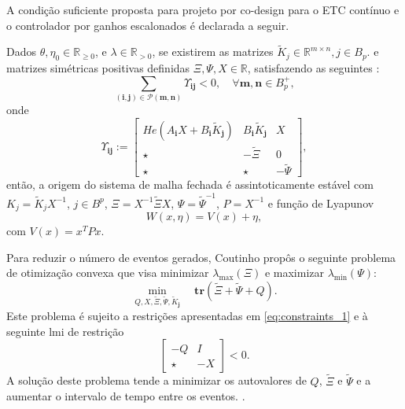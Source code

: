 A condição suficiente proposta para projeto por co-design para o ETC contínuo  e o controlador por ganhos escalonados é declarada a seguir.
\begin{theorem}
  \label{theorem:constraints-2}
  Dados $\theta, \eta_0 \in \mathbb{R}_{\geq 0}$, e $\lambda \in \mathbb{R}_{> 0}$, se existirem as matrizes $\tilde{K}_j \in \mathbb{R}^{m \times n}, j \in B_p$. e matrizes simétricas positivas definidas $\Xi, \Psi, X \in \mathbb{R}$, satisfazendo as seguintes :
  \begin{equation}
    \sum_{(\mathbf{i}, \mathbf{j}) \in \mathscr{P} (\mathbf{m},\mathbf{n})} \Upsilon_{\mathbf{ij}} < 0, \quad \forall \mathbf{m}, \mathbf{n} \in B_p^+,
    \label{eq:constraints_1}
  \end{equation}
  onde
  \begin{equation}
    \Upsilon_{\mathbf{ij}} :=
    \begin{bmatrix}
      He(A_\mathbf{i}X +B_\mathbf{i}\tilde{K}_\mathbf{j}) & B_\mathbf{i}\tilde{K}_{\mathbf{j}} & X             \\
      \star                                               & -\tilde{\Xi}                       & 0             \\
      \star                                               & \star                              & -\tilde{\Psi}
    \end{bmatrix},
  \end{equation}
  então, a origem do sistema de malha fechada é assintoticamente estável com $K_j = \tilde{K}_jX^{-1}$, $j \in B^p$, $\Xi= X^{-1}\tilde{\Xi}X$, $\Psi = \tilde{\Psi}^{-1}$, $P = X^{-1}$ e função de Lyapunov
  \begin{equation}
    W(x, \eta) = V(x) + \eta,
  \end{equation}
  com $V(x)=x^TPx$.
\end{theorem}

Para reduzir o número de eventos gerados, Coutinho propôs o seguinte problema de otimização convexa que visa minimizar $\lambda_{\max} (\Xi)$ e maximizar $\lambda_{\min}(\Psi)$: \begin{equation}\underset{Q, X, \tilde{\Xi}, \tilde{\Psi}, \tilde{K}_\mathbf{j}}\min \quad \mathbf{tr}(\tilde{\Xi} + \tilde{\Psi} + Q). \label{eq:optimization_problem}\end{equation} Este problema é sujeito a restrições apresentadas em \ref{eq:constraints_1} e à seguinte \acrshort{lmi} de restrição \begin{equation}\begin{bmatrix}
  -Q & I \\ \star & -X
\end{bmatrix} < 0. \label{eq:constraints_2}\end{equation} A solução deste problema tende a minimizar os autovalores de $Q$, $\tilde{\Xi}$ e $\tilde{\Psi}$ e a aumentar o intervalo de tempo entre os eventos. \cite{coutinho2021}.


